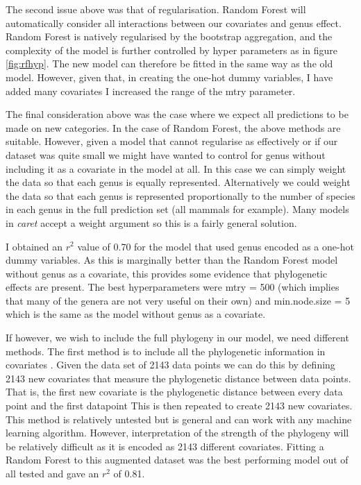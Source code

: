 \documentclass[10pt,]{article}
\begin{document}
The second issue above was that of regularisation.
Random Forest will automatically consider all interactions between our covariates and genus effect.
Random Forest is natively regularised by the bootstrap aggregation, and the complexity of the model is further controlled by hyper parameters as in figure \ref{fig:rfhyp}.
The new model can therefore be fitted in the same way as the old model.
However, given that, in creating the one-hot dummy variables, I have added many covariates I increased the range of the mtry parameter.

The final consideration above was the case where we expect all predictions to be made on new categories.
In the case of Random Forest, the above methods are suitable.
However, given a model that cannot regularise as effectively or if our dataset was quite small we might have wanted to control for genus without including it as a covariate in the model at all.
In this case we can simply weight the data so that each genus is equally represented.
Alternatively we could weight the data so that each genus is represented proportionally to the number of species in each genus in the full prediction set (all mammals for example).
Many models in \emph{caret} accept a weight argument so this is a fairly general solution.

I obtained an \(r^2\) value of 0.70 for the model that used genus encoded as a one-hot dummy variables.
As this is marginally better than the Random Forest model without genus as a covariate, this provides some evidence that phylogenetic effects are present.
The best hyperparameters were mtry = 500 (which implies that many of the genera are not very useful on their own) and min.node.size = 5 which is the same as the model without genus as a covariate.

If however, we wish to include the full phylogeny in our model, we need different methods.
The first method is to include all the phylogenetic information in covariates \citep{hengl2018random}.
Given the data set of 2143 data points we can do this by defining 2143 new covariates that measure the phylogenetic distance between data points.
That is, the first new covariate is the phylogenetic distance between every data point and the first datapoint
This is then repeated to create 2143 new covariates.
This method is relatively untested but is general and can work with any machine learning algorithm.
However, interpretation of the strength of the phylogeny will be relatively difficult as it is encoded as 2143 different covariates.
Fitting a Random Forest to this augmented dataset was the best performing model out of all tested and gave an \(r^2\) of 0.81.
\end{document}
